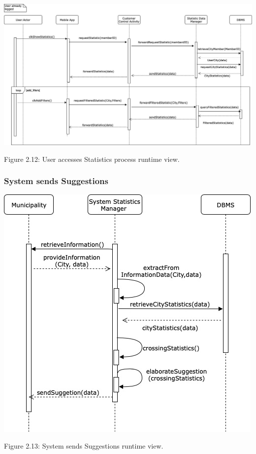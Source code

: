 \documentclass[12pt]{article}
\begin{document}
\begin{center}
\includegraphics[scale=0.28]{SequenceDiagram/UserStatistics.jpg}


\vspace{2mm}
Figure 2.12: User accesses Statistics process runtime view.
\end{center}

\subsubsection{System sends Suggestions}
\vspace{2mm}
\begin{center}
\includegraphics[scale=0.45]{SequenceDiagram/municipalitySuggestion.jpg}


\vspace{2mm}
Figure 2.13: System sends Suggestions runtime view.
\end{center}
\end{document}
